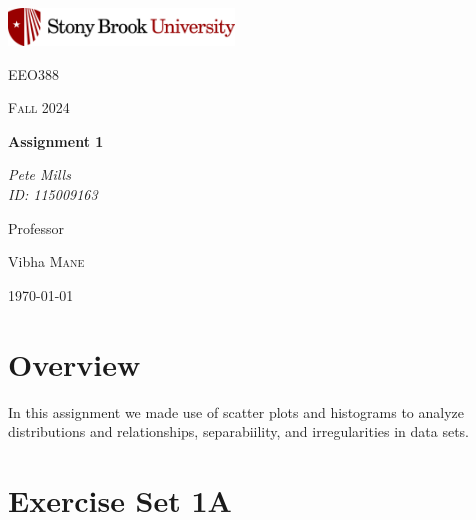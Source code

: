 \documentclass{article}
\begin{document}
	
\begin{titlepage}
	\centering
	\includegraphics[width=0.45\textwidth]{sbu}\par\vspace{1cm}
	{\LARGE \textsc{EEO388}\par}
	\vspace{1cm}
	{\Large \textsc{Fall 2024}\par}
	\vspace{1.5cm}
	{\huge\bfseries Assignment 1\par}
	\vspace{2cm}
	{\Large\itshape Pete Mills\\ID: 115009163\par}
	\vfill
	Professor\par
	Vibha \textsc{Mane}

	\vfill

	{\large \today\par}
\end{titlepage}


	
	

	\section*{Overview}
	
	 In this assignment we made use of scatter plots and histograms to analyze distributions and relationships, separabiility, and irregularities in data sets.

	
	\section{Exercise Set 1A}
\end{document}
